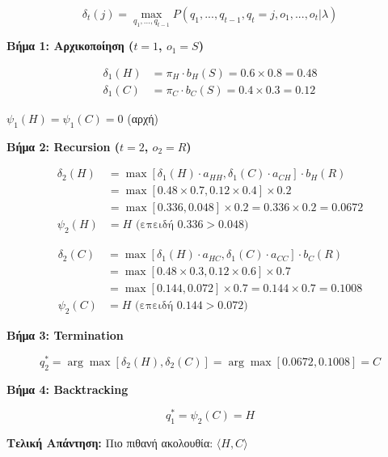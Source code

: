 $$\delta_t(j) = \max_{q_1,...,q_{t-1}} P(q_1,...,q_{t-1}, q_t=j, o_1,...,o_t | \lambda)$$

\textbf{Βήμα 1: Αρχικοποίηση ($t=1$, $o_1 = S$)}

\begin{align*}
\delta_1(H) &= \pi_H \cdot b_H(S) = 0.6 \times 0.8 = 0.48 \\
\delta_1(C) &= \pi_C \cdot b_C(S) = 0.4 \times 0.3 = 0.12
\end{align*}

$\psi_1(H) = \psi_1(C) = 0$ (αρχή)

\textbf{Βήμα 2: Recursion ($t=2$, $o_2 = R$)}

\begin{align*}
\delta_2(H) &= \max[\delta_1(H) \cdot a_{HH}, \delta_1(C) \cdot a_{CH}] \cdot b_H(R) \\
&= \max[0.48 \times 0.7, 0.12 \times 0.4] \times 0.2 \\
&= \max[0.336, 0.048] \times 0.2 = 0.336 \times 0.2 = 0.0672 \\
\psi_2(H) &= H \text{ (επειδή } 0.336 > 0.048\text{)}
\end{align*}

\begin{align*}
\delta_2(C) &= \max[\delta_1(H) \cdot a_{HC}, \delta_1(C) \cdot a_{CC}] \cdot b_C(R) \\
&= \max[0.48 \times 0.3, 0.12 \times 0.6] \times 0.7 \\
&= \max[0.144, 0.072] \times 0.7 = 0.144 \times 0.7 = 0.1008 \\
\psi_2(C) &= H \text{ (επειδή } 0.144 > 0.072\text{)}
\end{align*}

\textbf{Βήμα 3: Termination}

$$q_2^* = \arg\max[\delta_2(H), \delta_2(C)] = \arg\max[0.0672, 0.1008] = C$$

\textbf{Βήμα 4: Backtracking}

$$q_1^* = \psi_2(C) = H$$

\textbf{Τελική Απάντηση:} Πιο πιθανή ακολουθία: $\langle H, C \rangle$

\begin{center}
\end{center}

